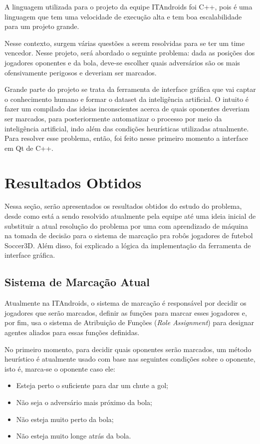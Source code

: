 \documentclass[a4paper,12pt]{article}
\begin{document}
A linguagem utilizada para o projeto da equipe ITAndroids foi C++, pois é uma linguagem que tem uma velocidade de execução alta e tem boa escalabilidade para um projeto grande.

Nesse contexto, surgem várias questões a serem resolvidas para se ter um time vencedor. Nesse projeto, será abordado o seguinte problema: dada as posições dos jogadores oponentes e da bola, deve-se escolher quais adversários são os mais ofensivamente perigosos e deveriam ser marcados.

Grande parte do projeto se trata da ferramenta de interface gráfica que vai captar o conhecimento humano e formar o dataset da inteligência artificial. O intuito é fazer um compilado das ideias inconscientes acerca de quais oponentes deveriam ser marcados, para posteriormente automatizar o processo por meio da inteligência artificial, indo além das condições heurísticas utilizadas atualmente. Para resolver esse problema, então, foi feito nesse primeiro momento a interface em Qt de C++.

\section{Resultados Obtidos}

Nessa seção, serão apresentados os resultados obtidos do estudo do problema, desde como está a sendo resolvido atualmente pela equipe até uma ideia inicial de substituir a atual resolução do problema por uma com aprendizado de máquina na tomada de decisão para o sistema de marcação pra robôs jogadores de futebol Soccer3D. Além disso, foi explicado a lógica da implementação da ferramenta de interface gráfica.

\subsection{Sistema de Marcação Atual}

Atualmente na ITAndroids, o sistema de marcação é responsável por decidir os jogadores que serão marcados, definir as funções para marcar esses jogadores e, por fim, usa o sistema de Atribuição de Funções (\textit{Role Assignment}) para designar agentes aliados para essas funções definidas.

No primeiro momento, para decidir quais oponentes serão marcados, um método heurístico é atualmente usado com base nas seguintes condições sobre o oponente, isto é, marca-se o oponente caso ele:

\begin{itemize}
\item Esteja perto o suficiente para dar um chute a gol;
\item Não seja o adversário mais próximo da bola;
\item Não esteja muito perto da bola;
\item Não esteja muito longe atrás da bola.
\end{itemize}
\end{document}
